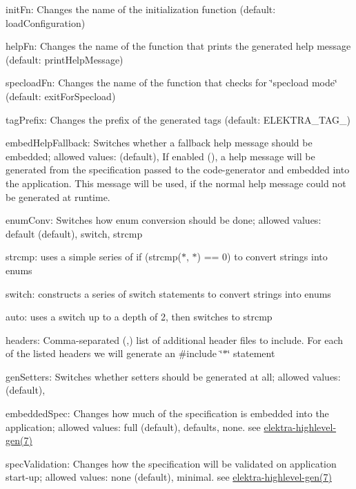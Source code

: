 \begin{DoxyItemize}
\item {\ttfamily init\+Fn}\+: Changes the name of the initialization function (default\+: {\ttfamily load\+Configuration})
\item {\ttfamily help\+Fn}\+: Changes the name of the function that prints the generated help message (default\+: {\ttfamily print\+Help\+Message})
\item {\ttfamily specload\+Fn}\+: Changes the name of the function that checks for \char`\"{}specload mode\char`\"{} (default\+: {\ttfamily exit\+For\+Specload})
\item {\ttfamily tag\+Prefix}\+: Changes the prefix of the generated tags (default\+: {\ttfamily E\+L\+E\+K\+T\+R\+A\+\_\+\+T\+A\+G\+\_\+})
\item {\ttfamily embed\+Help\+Fallback}\+: Switches whether a fallback help message should be embedded; allowed values\+: {} (default), {} If enabled ({}), a help message will be generated from the specification passed to the code-\/generator and embedded into the application. This message will be used, if the normal help message could not be generated at runtime.
\item {\ttfamily enum\+Conv}\+: Switches how enum conversion should be done; allowed values\+: {\ttfamily default} (default), {\ttfamily switch}, {\ttfamily strcmp}
\begin{DoxyItemize}
\item {\ttfamily strcmp}\+: uses a simple series of {\ttfamily if (strcmp($\ast$, $\ast$) == 0)} to convert strings into enums
\item {\ttfamily switch}\+: constructs a series of {\ttfamily switch} statements to convert strings into enums
\item {\ttfamily auto}\+: uses a {\ttfamily switch} up to a depth of 2, then switches to {\ttfamily strcmp}
\end{DoxyItemize}
\item {\ttfamily headers}\+: Comma-\/separated ({\ttfamily ,}) list of additional header files to include. For each of the listed headers we will generate an {\ttfamily \#include \char`\"{}$\ast$\char`\"{}} statement
\item {\ttfamily gen\+Setters}\+: Switches whether setters should be generated at all; allowed values\+: {} (default), {}
\item {\ttfamily embedded\+Spec}\+: Changes how much of the specification is embedded into the application; allowed values\+: {\ttfamily full} (default), {\ttfamily defaults}, {\ttfamily none}. see \mbox{\hyperlink{doc_help_elektra-highlevel-gen_md}{elektra-\/highlevel-\/gen(7)}}
\item {\ttfamily spec\+Validation}\+: Changes how the specification will be validated on application start-\/up; allowed values\+: {\ttfamily none} (default), {\ttfamily minimal}. see \mbox{\hyperlink{doc_help_elektra-highlevel-gen_md}{elektra-\/highlevel-\/gen(7)}}
\end{DoxyItemize}

